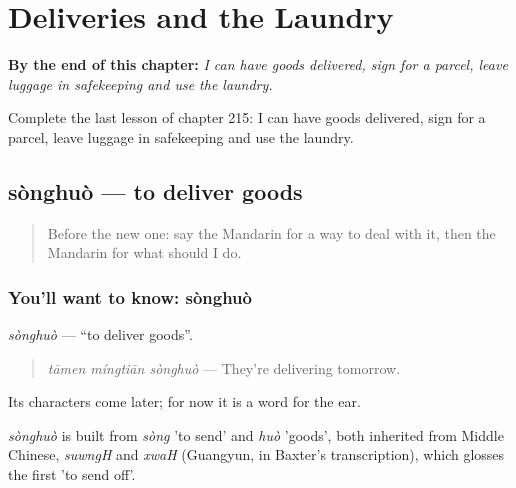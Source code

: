
\chapter{Deliveries and the Laundry}
\label{ch:zh-deliveries-and-the-laundry}

\begin{chapteropening}
\textbf{By the end of this chapter:} \emph{I can have goods delivered, sign for a parcel, leave luggage in safekeeping and use the laundry.}

Complete the last lesson of chapter 215: I can have goods delivered, sign for a parcel, leave luggage in safekeeping and use the laundry.
\end{chapteropening}

\section[sònghuò]{sònghuò — to deliver goods}

\label{lesson:ZH-C215-songhuo}



\begin{quote}
Before the new one: say the Mandarin for a way to deal with it, then the Mandarin for what should I do.
\end{quote}

\subsection*{You'll want to know: sònghuò}
\emph{sònghuò} — \textquotedblleft{}to deliver goods\textquotedblright{}.

\begin{quote}
\emph{tāmen míngtiān sònghuò} — They're delivering tomorrow.
\end{quote}

Its characters come later; for now it is a word for the ear.

\begin{cousinweb}
\emph{sònghuò} is built from \emph{sòng} 'to send' and \emph{huò} 'goods', both inherited from Middle Chinese, \emph{suwngH} and \emph{xwaH} (Guangyun, in Baxter's transcription), which glosses the first 'to send off'.
\end{cousinweb}

